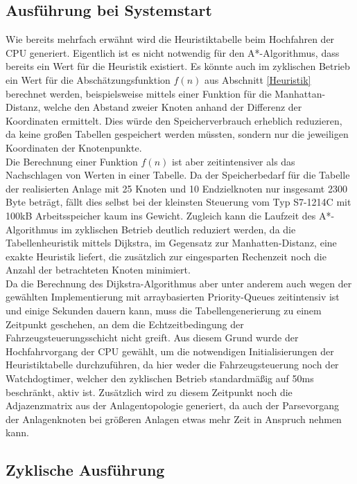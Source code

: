 	
		\subsection{Ausführung bei Systemstart}
			
			Wie bereits mehrfach erwähnt wird die Heuristiktabelle beim Hochfahren der CPU generiert. Eigentlich ist es nicht notwendig für den A*-Algorithmus, dass bereits ein Wert für die Heuristik existiert. Es könnte auch im zyklischen Betrieb ein Wert für die Abschätzungsfunktion $f(n)$ aus Abschnitt \ref{Heuristik} berechnet werden, beispielsweise mittels einer Funktion für die Manhattan-Distanz, welche den Abstand zweier Knoten anhand der Differenz der Koordinaten ermittelt. Dies würde den Speicherverbrauch erheblich reduzieren, da keine großen Tabellen gespeichert werden müssten, sondern nur die jeweiligen Koordinaten der Knotenpunkte.\\
			
			Die Berechnung einer Funktion $f(n)$ ist aber zeitintensiver als das Nachschlagen von Werten in einer Tabelle. Da der Speicherbedarf für die Tabelle der realisierten Anlage mit 25 Knoten und 10 Endzielknoten nur insgesamt 2300 Byte beträgt, fällt dies selbst bei der kleinsten Steuerung vom Typ S7-1214C mit 100kB Arbeitsspeicher kaum ins Gewicht. Zugleich kann die Laufzeit des A*-Algorithmus im zyklischen Betrieb deutlich reduziert werden, da die Tabellenheuristik mittels Dijkstra, im Gegensatz zur Manhatten-Distanz, eine exakte Heuristik liefert, die zusätzlich zur eingesparten Rechenzeit noch die Anzahl der betrachteten Knoten minimiert.\\
			
			Da die Berechnung des Dijkstra-Algorithmus aber unter anderem auch wegen der gewählten Implementierung mit arraybasierten Priority-Queues zeitintensiv ist\cite{BorisCherkassky1993} und einige Sekunden dauern kann, muss die Tabellengenerierung zu einem Zeitpunkt geschehen, an dem die Echtzeitbedingung der Fahrzeugsteuerungsschicht nicht greift. Aus diesem Grund wurde der Hochfahrvorgang der CPU gewählt, um die notwendigen Initialisierungen der Heuristiktabelle durchzuführen, da hier weder die Fahrzeugsteuerung noch der Watchdogtimer, welcher den zyklischen Betrieb standardmäßig auf 50ms beschränkt, aktiv ist. Zusätzlich wird zu diesem Zeitpunkt noch die Adjazenzmatrix aus der Anlagentopologie generiert, da auch der Parsevorgang der Anlagenknoten bei größeren Anlagen etwas mehr Zeit in Anspruch nehmen kann.
				
		\subsection{Zyklische Ausführung}
		
